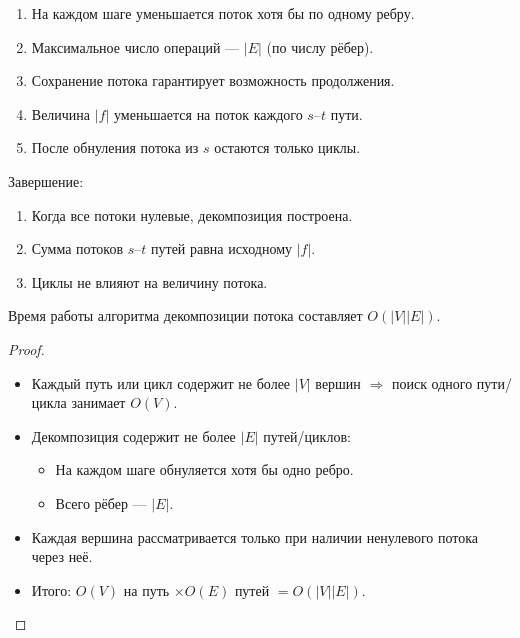 \documentclass[a4paper,14pt]{article}
\begin{document}
    \begin{enumerate}
        \item На каждом шаге уменьшается поток хотя бы по одному ребру.
        \item Максимальное число операций — $|E|$ (по числу рёбер).
        \item Сохранение потока гарантирует возможность продолжения.
        \item Величина $|f|$ уменьшается на поток каждого $s$–$t$ пути.
        \item После обнуления потока из $s$ остаются только циклы.
    \end{enumerate}
    Завершение:
    \begin{enumerate}
        \item Когда все потоки нулевые, декомпозиция построена.
        \item Сумма потоков $s$–$t$ путей равна исходному $|f|$.
        \item Циклы не влияют на величину потока.
    \end{enumerate}
    \begin{prop}
        Время работы алгоритма декомпозиции потока составляет $O(|V||E|)$.
    \end{prop}
    \begin{proof}
        \begin{itemize}
            \item Каждый путь или цикл содержит не более $|V|$ вершин $\Rightarrow$ поиск одного пути/цикла занимает $O(V)$.
            
            \item Декомпозиция содержит не более $|E|$ путей/циклов:
            \begin{itemize}
              \item На каждом шаге обнуляется хотя бы одно ребро.
              \item Всего рёбер — $|E|$.
            \end{itemize}
            
            \item Каждая вершина рассматривается только при наличии ненулевого потока через неё.
            \item Итого: $O(V)$ на путь $\times O(E)$ путей $= O(|V||E|)$.
          \end{itemize}
    \end{proof}
\end{document}
